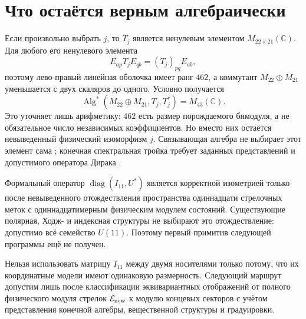 \section{Что остаётся верным алгебраически}

Если произвольно выбрать $j$, то $T_j$ является ненулевым элементом
$M_{22\times21}(\mathbb C)$. Для любого его ненулевого элемента
\begin{equation}
 E_{ap}T_jE_{qb}=(T_j)_{pq}E_{ab},
\end{equation}
поэтому лево-правый линейная оболочка имеет ранг $462$, а коммутант
$M_{22}\oplus M_{21}$ уменьшается с двух скаляров до одного. Условно
получается
\begin{equation}
 \operatorname{Alg}^*(M_{22}\oplus M_{21},T_j,T_j^*)=M_{43}(\mathbb C).
\end{equation}
Это уточняет лишь арифметику: $462$ есть размер порождаемого бимодуля, а не
обязательное число независимых коэффициентов. Но вместо них остаётся
невыведенный физический изоморфизм $j$. Связывающая алгебра не выбирает
этот элемент сама \cite{v8-polar-morita-bert}; конечная спектральная тройка
требует заданных представлений и допустимого оператора Дирака
\cite{v8-polar-morita-krajewski,v8-polar-morita-cacic}.

\begin{theorem}
Формальный оператор $\operatorname{diag}(I_{11},U^*)$ является корректной
изометрией только после невыведенного отождествления пространства
одиннадцати стрелочных меток с одиннадцатимерным физическим модулем состояний.
Существующие полярная, Ходж- и индексная структуры не выбирают это
отождествление: допустимо всё семейство $U(11)$. Поэтому первый примитив
следующей программы ещё не получен.
\end{theorem}

\begin{nogocriterion}
Нельзя использовать матрицу $I_{11}$ между двумя носителями только потому,
что их координатные модели имеют одинаковую размерность. Следующий маршрут
допустим лишь после классификации эквивариантных отображений от полного
физического модуля стрелок $\mathcal E_{\rm new}$ к модулю концевых секторов с
учётом представления конечной алгебры, вещественной структуры и градуировки.
\end{nogocriterion}


